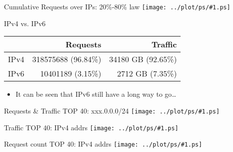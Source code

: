\documentclass{beamer}
\newcommand\graph[1]{{\texttt{[image: ../plot/ps/\#1.ps]}}}
\begin{document}
\begin{frame}{Cumulative Requests over IPs: 20\%-80\% law}
\graph{req-acc-ip}
\end{frame}

\begin{frame}{IPv4 vs. IPv6}
\begin{tabular}[t]{|l|r|r|}
\hline
 & Requests & Traffic \\
\hline
IPv4 & 318575688 (96.84\%) & 34180 GB (92.65\%) \\
IPv6 & 10401189 (3.15\%) & 2712 GB (7.35\%) \\
\hline
\end{tabular}
\begin{itemize}
  \item It can be seen that IPv6 still have a long way to go\ldots
\end{itemize}
\end{frame}

\begin{frame}{Requests \& Traffic TOP 40: xxx.0.0.0/24}
\graph{req-ipv4-0}
\end{frame}

\begin{frame}{Traffic TOP 40: IPv4 addrs}
\graph{req-ipv4-top40}
\end{frame}

\begin{frame}{Request count TOP 40: IPv4 addrs}
\graph{req-ipv4-top40-req}
\end{frame}
\end{document}
